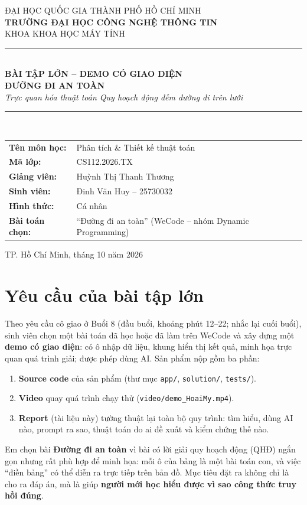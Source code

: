 \documentclass[12pt,a4paper]{article}
\begin{document}
\begin{titlepage}
\centering
\vspace*{0.6cm}
{\large ĐẠI HỌC QUỐC GIA THÀNH PHỐ HỒ CHÍ MINH}\\[4pt]
{\large\bfseries TRƯỜNG ĐẠI HỌC CÔNG NGHỆ THÔNG TIN}\\[4pt]
{\large KHOA KHOA HỌC MÁY TÍNH}\\[1.2cm]
\rule{\linewidth}{1pt}\\[10pt]
{\Large\bfseries\color{dnavy} BÀI TẬP LỚN -- DEMO CÓ GIAO DIỆN}\\[14pt]
{\LARGE\bfseries ĐƯỜNG ĐI AN TOÀN}\\[10pt]
{\large\itshape Trực quan hóa thuật toán Quy hoạch động đếm đường đi trên lưới}\\[10pt]
\rule{\linewidth}{1pt}\\[1.4cm]
\begin{tabular}{@{}>{\bfseries}l l@{}}
Tên môn học: & Phân tích \& Thiết kế thuật toán \\[6pt]
Mã lớp: & CS112.2026.TX \\[6pt]
Giảng viên: & Huỳnh Thị Thanh Thương \\[6pt]
Sinh viên: & Đinh Văn Huy -- 25730032 \\[6pt]
Hình thức: & Cá nhân \\[6pt]
Bài toán chọn: & ``Đường đi an toàn'' (WeCode -- nhóm Dynamic Programming)\\
\end{tabular}
\vfill
{\large TP. Hồ Chí Minh, tháng 10 năm 2026}
\end{titlepage}

\tableofcontents
\newpage

\section{Yêu cầu của bài tập lớn}
Theo yêu cầu cô giao ở Buổi 8 (đầu buổi, khoảng phút 12--22; nhắc lại cuối buổi), sinh viên chọn một bài toán đã học hoặc đã làm trên WeCode và xây dựng một \textbf{demo có giao diện}: có ô nhập dữ liệu, khung hiển thị kết quả, minh họa trực quan quá trình giải; được phép dùng AI. Sản phẩm nộp gồm ba phần:
\begin{enumerate}
  \item \textbf{Source code} của sản phẩm (thư mục \texttt{app/}, \texttt{solution/}, \texttt{tests/}).
  \item \textbf{Video} quay quá trình chạy thử (\texttt{video/demo\_HoaiMy.mp4}).
  \item \textbf{Report} (tài liệu này) tường thuật lại toàn bộ quy trình: tìm hiểu, dùng AI nào, prompt ra sao, thuật toán do ai đề xuất và kiểm chứng thế nào.
\end{enumerate}
Em chọn bài \textbf{Đường đi an toàn} vì bài có lời giải quy hoạch động (QHĐ) ngắn gọn nhưng rất phù hợp để minh họa: mỗi ô của bảng là một bài toán con, và việc ``điền bảng'' có thể diễn ra trực tiếp trên bản đồ. Mục tiêu đặt ra không chỉ là cho ra đáp án, mà là giúp \textbf{người mới học hiểu được vì sao công thức truy hồi đúng}.
\end{document}
